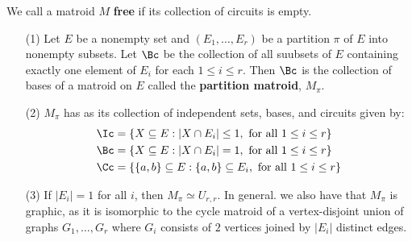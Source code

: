 \begin{definition}
    We call a matroid $M$  \textbf{free} if its collection of circuits is empty.
\end{definition}

\begin{example}\label{1.10}
    \begin{enumerate}
        \item[(1)] Let $E$ be a nonempty set and  $(E_1, \dots, E_r)$ be a
            partition $\pi$ of  $E$ into nonempty subsets. Let  $\Bc$ be the
            collection of all suubsets of  $E$ containing exactly one element of
             $E_i$ for each  $1 \leq i \leq r$. Then $\Bc$ is the collection of
             bases of a matroid on $E$ called the \textbf{partition matroid},
             $M_\pi$.

         \item [(2)] $M_\pi$ has as its collection of independent sets, bases,
             and circuits given by:
             \begin{align*}
                 \Ic &= \{X \subseteq E : |X \cap E_i| \leq 1, \text{ for all }
                 1 \leq i \leq r\} \\
                 \Bc &= \{X \subseteq E : |X \cap E_i|=1, \text{ for all }
                 1 \leq i \leq r\} \\
                 \Cc &= \{\{a,b\} \subseteq E : \{a,b\} \subseteq E_i, \text{
                 for all } 1 \leq i \leq r\} \\
             \end{align*}

         \item[(3)] If $|E_i|=1$ for all  $i$, then  $M_\pi \simeq U_{r,r}$. In
             general. we also have that $M_\pi$ is graphic, as it is isomorphic
             to the cycle matroid of a vertex-disjoint union of graphs $G_1,
             \dots, G_r$ where $G_i$ consists of  $2$ vertices joined by $|E_i|$
             distinct edges.
    \end{enumerate}
\end{example}

